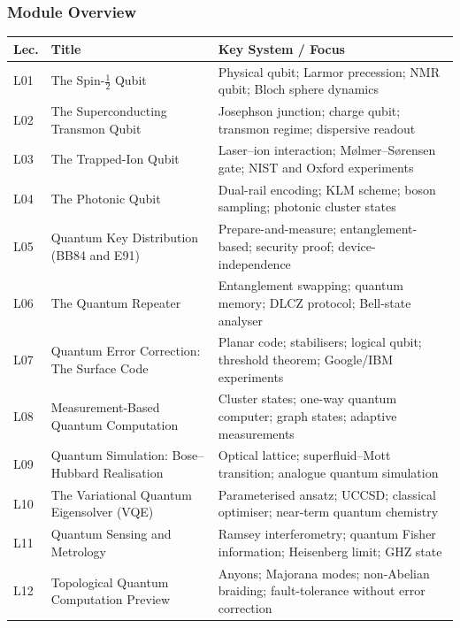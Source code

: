 \documentclass[11pt,a4paper]{article}
\begin{document}
\subsubsection*{Module Overview}
{\footnotesize
\begin{center}
\begin{tabular}{@{}lp{4.2cm}p{6.8cm}@{}}
\toprule
\textbf{Lec.} & \textbf{Title} & \textbf{Key System / Focus}\\
\midrule
L01 & The Spin-$\tfrac{1}{2}$ Qubit & Physical qubit; Larmor precession; NMR qubit; Bloch sphere dynamics\\
L02 & The Superconducting Transmon Qubit & Josephson junction; charge qubit; transmon regime; dispersive readout\\
L03 & The Trapped-Ion Qubit & Laser--ion interaction; M{\o}lmer--S{\o}rensen gate; NIST and Oxford experiments\\
L04 & The Photonic Qubit & Dual-rail encoding; KLM scheme; boson sampling; photonic cluster states\\
\midrule
L05 & Quantum Key Distribution (BB84 and E91) & Prepare-and-measure; entanglement-based; security proof; device-independence\\
L06 & The Quantum Repeater & Entanglement swapping; quantum memory; DLCZ protocol; Bell-state analyser\\
L07 & Quantum Error Correction: The Surface Code & Planar code; stabilisers; logical qubit; threshold theorem; Google/IBM experiments\\
L08 & Measurement-Based Quantum Computation & Cluster states; one-way quantum computer; graph states; adaptive measurements\\
\midrule
L09 & Quantum Simulation: Bose--Hubbard Realisation & Optical lattice; superfluid--Mott transition; analogue quantum simulation\\
L10 & The Variational Quantum Eigensolver (VQE) & Parameterised ansatz; UCCSD; classical optimiser; near-term quantum chemistry\\
L11 & Quantum Sensing and Metrology & Ramsey interferometry; quantum Fisher information; Heisenberg limit; GHZ state\\
L12 & Topological Quantum Computation Preview & Anyons; Majorana modes; non-Abelian braiding; fault-tolerance without error correction\\
\bottomrule
\end{tabular}
\end{center}
}
\end{document}
